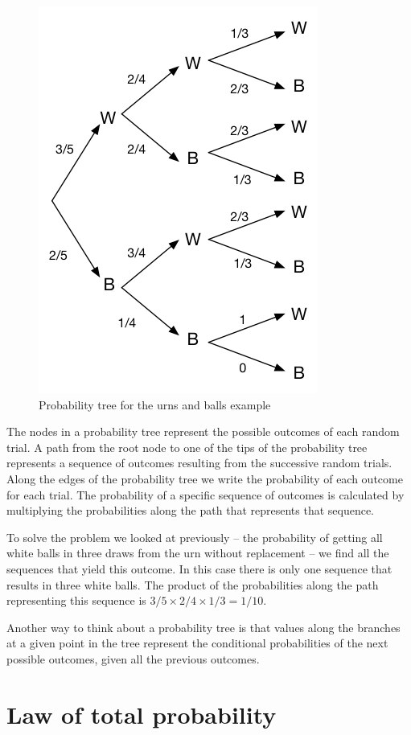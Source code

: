 \documentclass[]{book}
\theoremstyle{definition}
\theoremstyle{definition}
\theoremstyle{definition}
\theoremstyle{remark}
\begin{document}
\begin{figure}

{\centering \includegraphics[width=0.5\linewidth]{./figures/fig-urns-probability-tree} 

}

\caption{Probability tree for the urns and balls example}\label{fig:unnamed-chunk-356}
\end{figure}

The nodes in a probability tree represent the possible outcomes of each
random trial. A path from the root node to one of the tips of the
probability tree represents a sequence of outcomes resulting from the
successive random trials. Along the edges of the probability tree we
write the probability of each outcome for each trial. The probability of
a specific sequence of outcomes is calculated by multiplying the
probabilities along the path that represents that sequence.

To solve the problem we looked at previously -- the probability of
getting all white balls in three draws from the urn without replacement
-- we find all the sequences that yield this outcome. In this case there
is only one sequence that results in three white balls. The product of
the probabilities along the path representing this sequence is
\(3/5 \times 2/4 \times 1/3 = 1/10\).

Another way to think about a probability tree is that values along the
branches at a given point in the tree represent the conditional
probabilities of the next possible outcomes, given all the previous
outcomes.

\hypertarget{law-of-total-probability}{%
\section{Law of total probability}\label{law-of-total-probability}}
\end{document}
